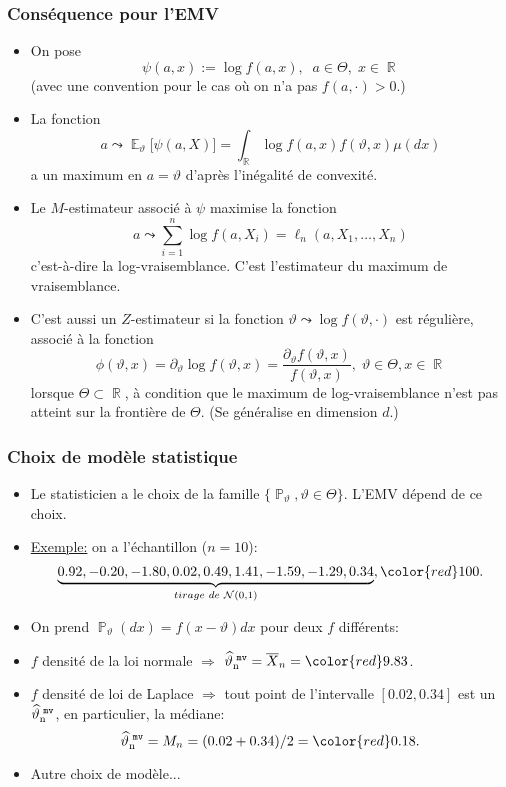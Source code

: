 ﻿\documentclass{beamer}
\DeclareMathOperator{\E}{{\mathbb E}}
\DeclareMathOperator{\R}{{\mathbb R}}
\DeclareMathOperator{\PP}{{\mathbb P}}
\DeclareMathOperator{\estMV}{\widehat \vartheta_n^{\,\,{\tt mv}}}
\begin{document}
\begin{frame}
\frametitle{Conséquence pour l'EMV}
\begin{itemize}
\item On pose
$$\boxed{\psi(a,x):=\log f(a,x),\;\;a \in \Theta,\;x\in\R}$$
(avec une convention pour le cas où on n'a pas $f(a,\cdot) >0$.)
\item La fonction
$$a \leadsto \E_\vartheta \big[\psi(a,X)\big]=\int_{\R}\log f(a,x) f(\vartheta,x) \mu(dx)$$
a un maximum en $a=\vartheta$ d'après {\color{red}l'inégalité de convexité}.
\end{itemize}
\end{frame}

\begin{frame}
\begin{itemize}
\item Le $M$-estimateur associé à $\psi$ maximise la fonction
$$a \leadsto \sum_{i = 1}^n \log f(a, X_i) = \ell_n(a, X_1,\ldots, X_n)$$
c'est-à-dire la {\color{red} log-vraisemblance}. C'est {\color{red}l'estimateur du maximum de vraisemblance}.

\item C'est aussi un $Z$-estimateur si la fonction $\vartheta \leadsto \log f(\vartheta, \cdot)$ est régulière, associé à la fonction
$$\phi(\vartheta, x) = \partial_\vartheta \log f(\vartheta, x) = \frac{\partial_\vartheta f(\vartheta, x)}{f(\vartheta, x)},\;\vartheta \in \Theta, x\in \R$$
lorsque $\Theta \subset \R$, \`a condition que le maximum de
log-vraisemblance n'est pas atteint sur la fronti\`ere de $\Theta$.
(Se généralise en dimension $d$.)
\end{itemize}
\end{frame}

\begin{frame}
\frametitle{Choix de mod\`ele statistique}
\begin{itemize}
\item  Le statisticien a le choix de la famille
$\{\PP_{\vartheta}, \vartheta\in\Theta\}$. L'EMV d\'epend de ce
choix.
\item \underline{Exemple:} on a l'\'echantillon ($n=10$):
$$ \underbrace{0.92, -0.20, -1.80, 0.02,  0.49, 1.41, -1.59, -1.29,
0.34}_{\footnotesize{tirage \ de \ {\mathcal N}(0,1)}},
{\color{red}100}.$$
\item On prend $\PP_{\vartheta}(dx) = f(x-\vartheta)dx$ pour deux
$f$ diff\'erents:
\item $f$ densit\'e de la loi normale $\Rightarrow$
$\estMV={\overline X}_n= {\color{red}9.83}$.
\item $f$ densit\'e de loi de Laplace $\Rightarrow$
 tout point de l'intervalle $[0.02, 0.34]$ est un $\estMV$, en
particulier, la m\'ediane: $$\estMV = M_n=
(0.02+0.34)/2={\color{red}0.18}.$$
\item {\color{red}Autre choix de mod\`ele...}
\end{itemize}
\end{frame}
\end{document}
